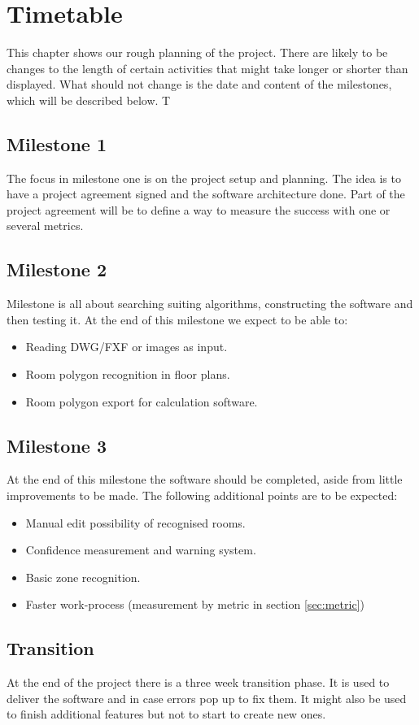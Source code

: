 \chapter{Timetable}

This chapter shows our rough planning of the project. There are likely to be changes to the length of certain activities that might take longer or shorter than displayed. What should not change is the date and content of the milestones, which will be described below.
T
\section{Milestone 1}
The focus in milestone one is on the project setup and planning. The idea is to have a project agreement signed and the software architecture done. Part of the project agreement will be to define a way to measure the success with one or several metrics.

\section{Milestone 2}
Milestone is all about searching suiting algorithms, constructing the software and then testing it. At the end of this milestone we expect to be able to:

\begin{itemize}
	\item Reading DWG/FXF or images as input.
	\item Room polygon recognition in floor plans.
	\item Room polygon export for calculation software.
\end{itemize}

\section{Milestone 3}
At the end of this milestone the software should be completed, aside from little improvements to be made. The following additional points are to be expected: 
\begin{itemize}
	\item Manual edit possibility of recognised rooms.
	\item Confidence measurement and warning system.
	\item Basic zone recognition.
	\item Faster work-process (measurement by metric in section \ref{sec:metric})
\end{itemize}

\section{Transition}
At the end of the project there is a three week transition phase. It is used to deliver the software and in case errors pop up to fix them. It might also be used to finish additional features but not to start to create new ones.